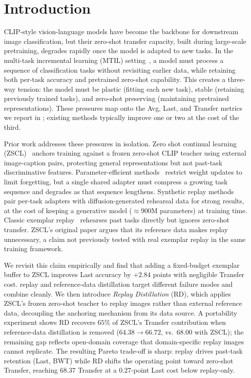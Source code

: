 \documentclass{article}
\begin{document}
  \section{Introduction}
  CLIP-style vision-language models have become the backbone for downstream image
  classification, but their zero-shot transfer capacity, built during large-scale
  pretraining, degrades rapidly once the model is adapted to new tasks. In the
  multi-task incremental learning (MTIL) setting~\cite{zheng2023zscl}, a model must
  process a sequence of classification tasks without revisiting earlier data, while
  retaining both per-task accuracy and pretrained zero-shot capability. This creates
  a three-way tension: the model must be plastic (fitting each new task), stable
  (retaining previously trained tasks), and zero-shot preserving (maintaining
  pretrained representations). These pressures map onto the Avg, Last, and Transfer
  metrics we report in ; existing methods typically improve
  one or two at the cost of the third.

  Prior work addresses these pressures in isolation. Zero shot continual learning (ZSCL)~\cite{zheng2023zscl}
  anchors training against a frozen zero-shot CLIP teacher using external
  image-caption pairs, protecting general representations but not past-task
  discriminative features. Parameter-efficient methods~\cite{yu2024moe, gao2024zaf,
  liu2025cclip} restrict weight updates to limit forgetting, but a single shared
  adapter must compress a growing task sequence and degrades as that sequence
  lengthens. Synthetic replay methods~\cite{loraloop2025, gift2025} pair per-task
  adapters with diffusion-generated rehearsal data for strong results, at the cost
  of keeping a generative model (${\approx}900$M parameters) at training time.
  Classic exemplar replay~\cite{rebuffi2017icarl, buzzega2020dark} rehearses past
  tasks directly but ignores zero-shot transfer. ZSCL's original paper argues that
  its reference data makes replay unnecessary, a claim not previously tested with
  real exemplar replay in the same training framework.

  We revisit this claim empirically and find that adding a fixed-budget exemplar
  buffer to ZSCL improves Last accuracy by $+2.84$ points with negligible Transfer
  cost.  replay and reference-data distillation target different failure modes and combine cleanly. We then introduce \emph{Replay Distillation} (RD), which applies
  ZSCL's frozen zero-shot teacher to replay images rather than external reference
  data, decoupling the anchoring mechanism from its data source. A portability
  experiment shows RD recovers $65\%$ of ZSCL's Transfer contribution when
  reference-data distillation is removed ($64.38 \to 66.72$, vs.\ $68.00$ with
  ZSCL); the remaining gap reflects open-domain coverage that domain-specific replay
  images cannot replicate. The resulting Pareto trade-off is sharp: replay drives
  past-task retention (Last, BWT) while RD shifts the operating point toward
  zero-shot Transfer, reaching $68.37$ Transfer at a $0.27$-point Last cost below
  replay-only.
\end{document}
